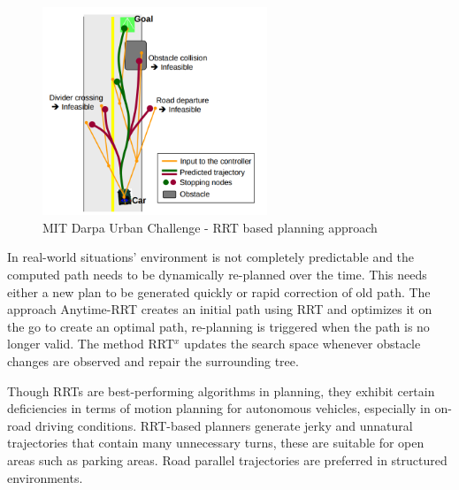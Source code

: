 \begin{figure}
	\centering
	\includegraphics[width=0.6\textwidth]{Images/related_work/mit_urban_planning.png}
	\caption{MIT Darpa Urban Challenge - RRT based planning approach}
	\label{mit_rrt_fig}
\end{figure} 

In real-world situations' environment is not completely predictable and the computed path needs to be dynamically re-planned over the time. This needs either a new plan to be generated quickly or rapid correction of old path. The approach Anytime-RRT \cite{anytimerrt} creates an initial path using RRT and optimizes it on the go to create an optimal path, re-planning is triggered when the path is no longer valid. The method RRT$^x$ \cite{rrtx} updates the search space whenever obstacle changes are observed and repair the surrounding tree. 

Though RRTs are best-performing algorithms in planning, they exhibit certain deficiencies in terms of motion planning for autonomous vehicles, especially in on-road driving conditions. RRT-based planners generate jerky and unnatural trajectories that contain many unnecessary turns\cite{improved_rrt}, these are suitable for open areas such as parking areas. Road parallel trajectories are preferred in structured environments.

